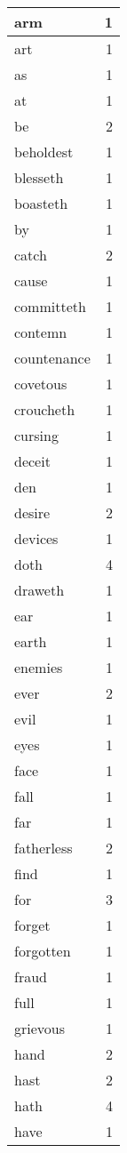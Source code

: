 \begin{center}
\begin{longtable}{l|r}
arm & 1 \\ \hline
art & 1 \\ \hline
as & 1 \\ \hline
at & 1 \\ \hline
be & 2 \\ \hline
beholdest & 1 \\ \hline
blesseth & 1 \\ \hline
boasteth & 1 \\ \hline
by & 1 \\ \hline
catch & 2 \\ \hline
cause & 1 \\ \hline
committeth & 1 \\ \hline
contemn & 1 \\ \hline
countenance & 1 \\ \hline
covetous & 1 \\ \hline
croucheth & 1 \\ \hline
cursing & 1 \\ \hline
deceit & 1 \\ \hline
den & 1 \\ \hline
desire & 2 \\ \hline
devices & 1 \\ \hline
doth & 4 \\ \hline
draweth & 1 \\ \hline
ear & 1 \\ \hline
earth & 1 \\ \hline
enemies & 1 \\ \hline
ever & 2 \\ \hline
evil & 1 \\ \hline
eyes & 1 \\ \hline
face & 1 \\ \hline
fall & 1 \\ \hline
far & 1 \\ \hline
fatherless & 2 \\ \hline
find & 1 \\ \hline
for & 3 \\ \hline
forget & 1 \\ \hline
forgotten & 1 \\ \hline
fraud & 1 \\ \hline
full & 1 \\ \hline
grievous & 1 \\ \hline
hand & 2 \\ \hline
hast & 2 \\ \hline
hath & 4 \\ \hline
have & 1 \\ \hline

\end{longtable}
\end{center}
